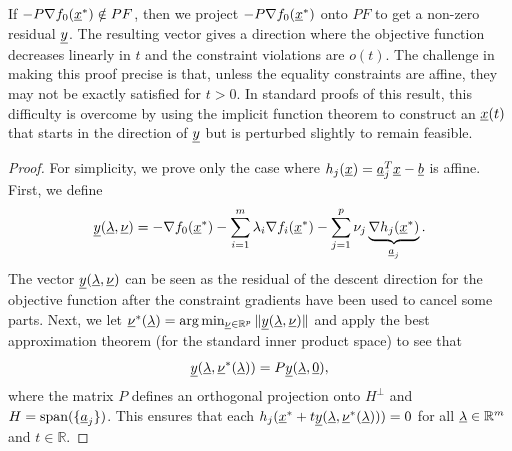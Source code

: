 If $-P \nabla f_0 (\underline{x}^*) \notin P F$, then we project $-P \nabla f_0 (\underline{x}^*)$ onto $PF$ to get a non-zero residual $\underline{y}$.
The resulting vector gives a direction where the objective function decreases linearly in $t$ and the constraint violations are $o(t)$.
The challenge in making this proof precise is that, unless the equality constraints are affine, they may not be exactly satisfied for $t>0$.
In standard proofs of this result, this difficulty is overcome by using the implicit function theorem to construct an $\underline{x} (t)$ that starts in the direction of $\underline{y}$ but is perturbed slightly to remain feasible.

\begin{proof}
For simplicity, we prove only the case where $h_j (\underline{x}) = \underline{a}_j^T \underline{x} - \underline{b}$ is affine.
First, we define 
\[ \underline{y} (\underline{\lambda},\underline{\nu}) = -\nabla f_0 (\underline{x}^*) - \sum_{i=1}^m \lambda_i \nabla f_i (\underline{x}^*) - \sum_{j=1}^p \nu_j \underbrace{\nabla h_j (\underline{x}^*)}_{\underline{a}_j}. \]
The vector $\underline{y} (\underline{\lambda},\underline{\nu})$ can be seen as the residual of the descent direction for the objective function after the constraint gradients have been used to cancel some parts.
Next, we let $\underline{\nu}^* (\underline{\lambda}) = \arg \min_{\underline{\nu}\in \mathbb{R}^p} \| \underline{y} (\underline{\lambda},\underline{\nu}) \|$
and apply the best approximation theorem (for the standard inner product space) to see that
\[ \underline{y} (\underline{\lambda},\underline{\nu}^* (\underline{\lambda})) = P \underline{y} (\underline{\lambda},\underline{0}), \]
where the matrix $P$ defines an orthogonal projection onto $H^\perp$ and $H = \mathrm{span} ( \{ \underline{a}_j \} )$.
This ensures that each $h_j ( \underline{x}^* + t \underline{y} (\underline{\lambda},\underline{\nu}^* (\underline{\lambda})) )=0$ for all $\underline{\lambda}\in \mathbb{R}^m$ and $t\in \mathbb{R}$.


\end{proof}
